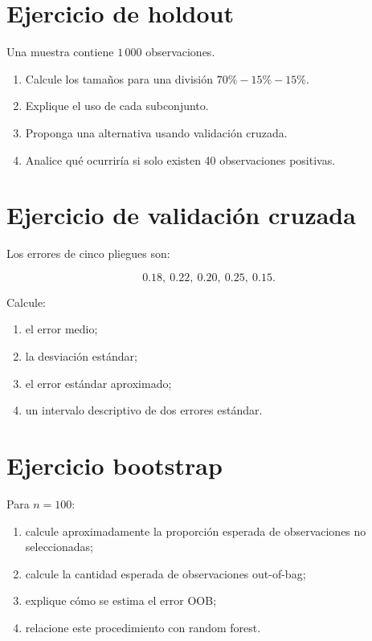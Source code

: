 \documentclass[
  spanish,
  11pt,
  letterpaper,
  DIV=11,
  numbers=noendperiod]{scrreprt}
\providecommand{\tightlist}{%
  \setlength{\itemsep}{0pt}\setlength{\parskip}{0pt}}
\theoremstyle{definition}
\theoremstyle{plain}
\theoremstyle{definition}
\theoremstyle{remark}
\begin{document}
\section{Ejercicio de holdout}\label{ejercicio-de-holdout}

Una muestra contiene \(1\,000\) observaciones.

\begin{enumerate}
\def\labelenumi{\arabic{enumi}.}
\tightlist
\item
  Calcule los tamaños para una división \(70\%-15\%-15\%\).
\item
  Explique el uso de cada subconjunto.
\item
  Proponga una alternativa usando validación cruzada.
\item
  Analice qué ocurriría si solo existen 40 observaciones positivas.
\end{enumerate}

\section{Ejercicio de validación
cruzada}\label{ejercicio-de-validaciuxf3n-cruzada}

Los errores de cinco pliegues son:

\[
0.18,\ 0.22,\ 0.20,\ 0.25,\ 0.15.
\]

Calcule:

\begin{enumerate}
\def\labelenumi{\arabic{enumi}.}
\tightlist
\item
  el error medio;
\item
  la desviación estándar;
\item
  el error estándar aproximado;
\item
  un intervalo descriptivo de dos errores estándar.
\end{enumerate}

\section{Ejercicio bootstrap}\label{ejercicio-bootstrap}

Para \(n=100\):

\begin{enumerate}
\def\labelenumi{\arabic{enumi}.}
\tightlist
\item
  calcule aproximadamente la proporción esperada de observaciones no
  seleccionadas;
\item
  calcule la cantidad esperada de observaciones out-of-bag;
\item
  explique cómo se estima el error OOB;
\item
  relacione este procedimiento con random forest.
\end{enumerate}
\end{document}
